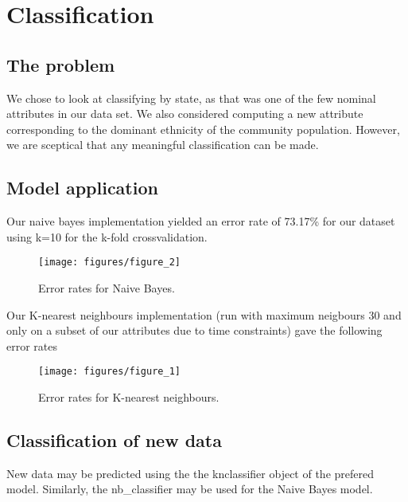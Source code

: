 \section{Classification}
\subsection{The problem}
We chose to look at classifying by state, as that was one of the few nominal attributes in our data set. We also considered computing a new attribute corresponding to the dominant ethnicity of the community population. However, we are sceptical that any meaningful classification can be made.

\subsection{Model application}
Our naive bayes implementation yielded an error rate of 73.17\% for our dataset using k=10 for the k-fold crossvalidation.
    \begin{figure}[H]
      \centering
        \texttt{[image: figures/figure\_2]}
        \caption{Error rates for Naive Bayes.}
        \label{fig:k}
    \end{figure}

Our K-nearest neighbours implementation (run with maximum neigbours 30 and only on a subset of our attributes due to time constraints) gave the following error rates
    \begin{figure}[H]
      \centering
        \texttt{[image: figures/figure\_1]}
        \caption{Error rates for K-nearest neighbours.}
        \label{fig:k}
    \end{figure}

\subsection{Classification of new data}
New data may be predicted using the the knclassifier object of the prefered model. Similarly, the nb\_classifier may be used for the Naive Bayes model.


